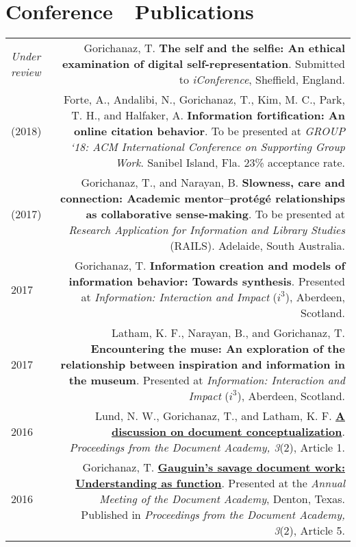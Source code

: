 \documentclass[letterpaper,11pt]{article}
\begin{document}
\section*{Conference~~Publications}
\begin{longtable}{ @{} L @{} R @{} }

\emph{Under review}&	Gorichanaz, T. \textbf{The self and the selfie: An ethical examination of digital self-representation}. Submitted to \emph{iConference}, Sheffield, England.\\[1em]

\hspace{-\myl}(2018)& Forte, A., Andalibi, N., Gorichanaz, T., Kim, M. C., Park, T. H., and Halfaker, A. \textbf{Information fortification: An online citation behavior}. To be presented at \emph{GROUP `18: ACM International Conference on Supporting Group Work}. Sanibel Island, Fla. 23\% acceptance rate.\\[1em]

\hspace{-\myl}(2017)&	Gorichanaz, T., and Narayan, B. \textbf{Slowness, care and connection: Academic mentor--prot\'eg\'e relationships as collaborative sense-making}. To be presented at \emph{Research Application for Information and Library Studies} (RAILS). Adelaide, South Australia.\\[1em]

2017&	Gorichanaz, T. \textbf{Information creation and models of information behavior: Towards synthesis}. Presented at \emph{Information: Interaction and Impact} ($i^3$), Aberdeen, Scotland.\\[1em]

2017&	Latham, K. F., Narayan, B., and Gorichanaz, T. \textbf{Encountering the muse: An exploration of the relationship between inspiration and information in the museum}. Presented at \emph{Information: Interaction and Impact} ($i^3$), Aberdeen, Scotland.\\[1em]

2016&	Lund, N. W., Gorichanaz, T., and Latham, K. F. \href{http://ideaexchange.uakron.edu/docam/vol3/iss2/1/}{\textbf{A discussion on document conceptualization}}. \emph{Proceedings from the Document Academy, 3}(2), Article 1. \\[1em]

2016&	Gorichanaz, T. \href{http://ideaexchange.uakron.edu/docam/vol3/iss2/5/}{\textbf{Gauguin's savage document work: Understanding as function}}. Presented at the \emph{Annual Meeting of the Document Academy}, Denton, Texas. Published in \emph{Proceedings from the Document Academy, 3}(2), Article 5. \\[1em]


\end{longtable}
\end{document}
